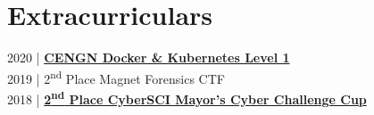 \documentclass[letterpaper]{deedy-resume} %
\begin{document}
\begin{minipage}[t]{0.33\textwidth}
\section{Extracurriculars}
2020 | \href{https://www.credly.com/badges/7a6c2383-9563-4d67-9878-a40bee831e53?source=linked_in_profile}{\bf CENGN Docker \& Kubernetes Level 1} \\
2019 | 2\textsuperscript{nd} Place Magnet Forensics CTF \\
2018 | \href{https://newsroom.carleton.ca/2018/mayors-cyber-challenge-cup-announces-winning-teams/}{\bf 2\textsuperscript{nd} Place CyberSCI Mayor's Cyber Challenge Cup}\\


\end{minipage} %
\hfill
%
%
\end{document}
